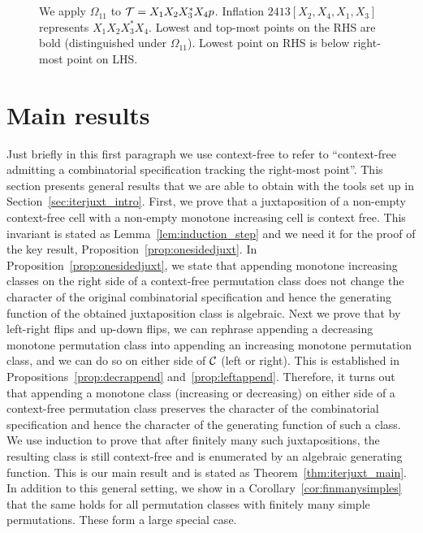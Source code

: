 \documentclass[12pt, a4paper, twoside]{report}
\begin{document}
\begin{figure}[!ht]
\\ \ \\
\caption{We apply $\Omega_{11}$ to $\mathcal{T} = X_1X_2X_3^*X_4p$. Inflation $2413[X_2,X_4,X_1,X_3]$ represents $X_1X_2X_3^*X_4$. Lowest and top-most points on the RHS are bold (distinguished under $\Omega_{11}$). Lowest point on RHS is below right-most point on LHS.}
\label{fig:iterjuxt_omega11action}
\end{figure}

\newpage
\section{Main results}
\label{sec:iterjuxt_main}

Just briefly in this first paragraph we use context-free to refer to ``context-free admitting a combinatorial specification tracking the right-most point''. This section presents general results that we are able to obtain with the tools set up in Section~\ref{sec:iterjuxt_intro}. First, we prove that a juxtaposition of a non-empty context-free cell with a non-empty monotone increasing cell is context free. This invariant is stated as Lemma~\ref{lem:induction_step} and we need it for the proof of the key result, Proposition~\ref{prop:onesidedjuxt}. In Proposition~\ref{prop:onesidedjuxt}, we state that appending monotone increasing classes on the right side of a context-free permutation class does not change the character of the original combinatorial specification and hence the generating function of the obtained juxtaposition class is algebraic. Next we prove that by left-right flips and up-down flips, we can rephrase appending a decreasing monotone permutation class into appending an increasing monotone permutation class, and we can do so on either side of $\mathcal{C}$ (left or right). This is established in Propositions~\ref{prop:decrappend} and~\ref{prop:leftappend}. Therefore, it turns out that appending a monotone class (increasing or decreasing) on either side of a context-free permutation class preserves the character of the combinatorial specification and hence the character of the generating function of such a class. We use induction to prove that after finitely many such juxtapositions, the resulting class is still context-free and is enumerated by an algebraic generating function. This is our main result and is stated as Theorem~\ref{thm:iterjuxt_main}. In addition to this general setting, we show in a Corollary~\ref{cor:finmanysimples} that the same holds for all permutation classes with finitely many simple permutations. These form a large special case.
\end{document}
